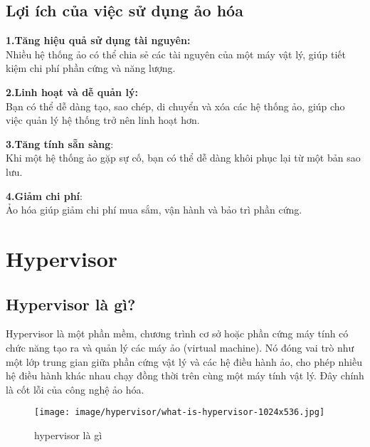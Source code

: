 \documentclass[a4paper,12pt]{article}
\begin{document}
\subsection{Lợi ích của việc sử dụng ảo hóa}
\textbf{1.Tăng hiệu quả sử dụng tài nguyên:}\\ 
Nhiều hệ thống ảo có thể chia sẻ các tài nguyên của một máy vật lý, giúp tiết kiệm chi phí phần cứng và năng lượng.


\noindent \textbf{2.Linh hoạt và dễ quản lý:}\\
Bạn có thể dễ dàng tạo, sao chép, di chuyển và xóa các hệ thống ảo, giúp cho việc quản lý hệ thống trở nên linh hoạt hơn.


\noindent \textbf{3.Tăng tính sẵn sàng}: \\
Khi một hệ thống ảo gặp sự cố, bạn có thể dễ dàng khôi phục lại từ một bản sao lưu.


\noindent \textbf{4.Giảm chi phí}: \\
Ảo hóa giúp giảm chi phí mua sắm, vận hành và bảo trì phần cứng.


\section{Hypervisor}
\subsection{Hypervisor là gì?}
Hypervisor là một phần mềm, chương trình cơ sở hoặc phần cứng máy tính có chức năng tạo ra và quản lý các máy ảo (virtual machine). Nó đóng vai trò như một lớp trung gian giữa phần cứng vật lý và các hệ điều hành ảo, cho phép nhiều hệ điều hành khác nhau chạy đồng thời trên cùng một máy tính vật lý.
Đây chính là cốt lỗi của công nghệ ảo hóa.\\


\begin{figure}[h]
    \centering
    \texttt{[image: image/hypervisor/what-is-hypervisor-1024x536.jpg]}
    \caption{hypervisor là gì}
    \label{}
\end{figure}
\end{document}
